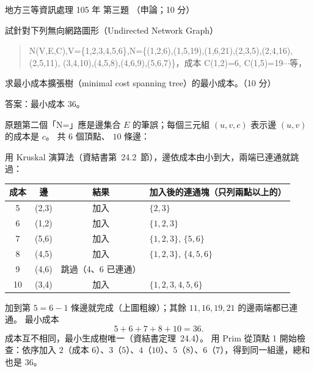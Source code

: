 \begin{pastexam}[label={px:df3-105-ds-03}]{地方三等資訊處理 105 年 第三題}
（申論；10 分）

試針對下列無向網路圖形（Undirected Network Graph）
\begin{quote}\raggedright
N(V,E,C),V=\{1,2,3,4,5,6\},N=\{(1,2,6),(1,5,19),(1,6,21),(2,3,5),(2,4,16),(2,5,11),
(3,4,10),(4,5,8),(4,6,9),(5,6,7)\}，成本 C(1,2)=6, C(1,5)=19$\cdots$等，
\end{quote}
求最小成本擴張樹（minimal cost spanning tree）的最小成本。（10 分）
\end{pastexam}

\begin{pastsoln}
答案：最小成本 $36$。

原題第二個「N=」應是邊集合 $E$ 的筆誤；每個三元組 $(u, v, c)$ 表示邊 $(u, v)$ 的成本是 $c$。 共 $6$ 個頂點、
$10$ 條邊：
\begin{center}
\end{center}
用 Kruskal 演算法（資結書第~24.2~節），邊依成本由小到大，兩端已連通就跳過：
\begin{center}
\small
\begin{tabular}{cccl}
\toprule
成本 & 邊 & 結果 & 加入後的連通塊（只列兩點以上的） \\
\midrule
5 & (2,3) & 加入 & $\{2,3\}$ \\
6 & (1,2) & 加入 & $\{1,2,3\}$ \\
7 & (5,6) & 加入 & $\{1,2,3\}$, $\{5,6\}$ \\
8 & (4,5) & 加入 & $\{1,2,3\}$, $\{4,5,6\}$ \\
9 & (4,6) & 跳過（4、6 已連通） & \\
10 & (3,4) & 加入 & $\{1,2,3,4,5,6\}$ \\
\bottomrule
\end{tabular}
\end{center}
加到第 $5 = 6 - 1$ 條邊就完成（上圖粗線）；其餘 $11, 16, 19, 21$ 的邊兩端都已連通。 最小成本
\[
5 + 6 + 7 + 8 + 10 = 36 .
\]
成本互不相同，最小生成樹唯一（資結書定理~24.4）。 用 Prim 從頂點 1 開始檢查：依序加入
$2$（成本 $6$）、$3$（$5$）、$4$（$10$）、$5$（$8$）、$6$（$7$），得到同一組邊，總和也是 $36$。
\end{pastsoln}
